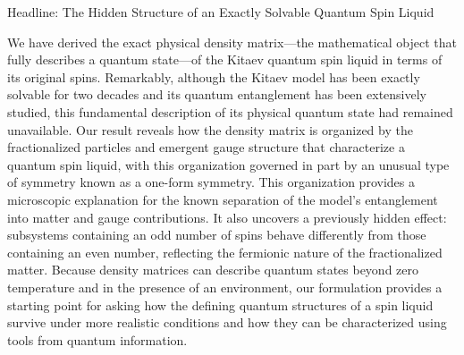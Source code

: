 Headline: The Hidden Structure of an Exactly Solvable Quantum Spin Liquid

We have derived the exact physical density matrix—the mathematical object that fully describes a quantum state—of the Kitaev quantum spin liquid in terms of its original spins. Remarkably, although the Kitaev model has been exactly solvable for two decades and its quantum entanglement has been extensively studied, this fundamental description of its physical quantum state had remained unavailable. Our result reveals how the density matrix is organized by the fractionalized particles and emergent gauge structure that characterize a quantum spin liquid, with this organization governed in part by an unusual type of symmetry known as a one-form symmetry. This organization provides a microscopic explanation for the known separation of the model’s entanglement into matter and gauge contributions. It also uncovers a previously hidden effect: subsystems containing an odd number of spins behave differently from those containing an even number, reflecting the fermionic nature of the fractionalized matter. Because density matrices can describe quantum states beyond zero temperature and in the presence of an environment, our formulation provides a starting point for asking how the defining quantum structures of a spin liquid survive under more realistic conditions and how they can be characterized using tools from quantum information.